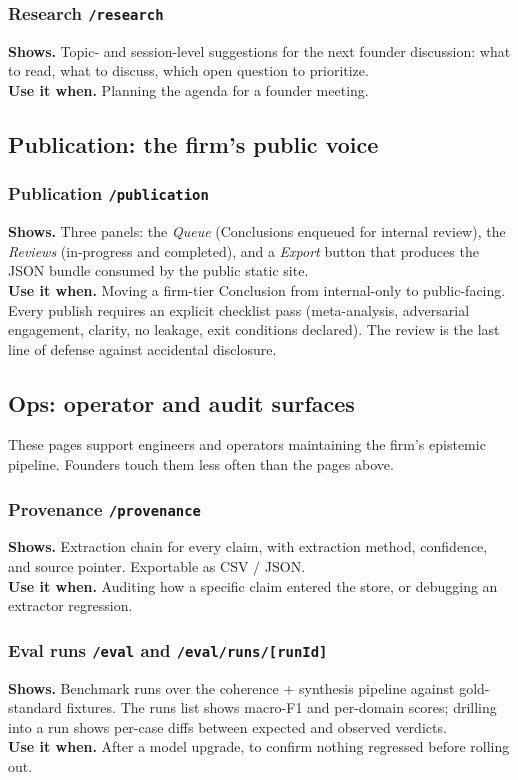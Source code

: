 \documentclass[11pt,letterpaper]{article}
\newcommand{\file}[1]{\texttt{#1}}
\newcommand{\tab}[1]{\textsl{#1}}
\begin{document}
\subsubsection*{Research \hfill \file{/research}}
\textbf{Shows.} Topic- and session-level suggestions for the next founder discussion: what to read, what to discuss, which open question to prioritize. \\
\textbf{Use it when.} Planning the agenda for a founder meeting.

\subsection{Publication: the firm's public voice}

\subsubsection*{Publication \hfill \file{/publication}}
\textbf{Shows.} Three panels: the \tab{Queue} (Conclusions enqueued for internal review), the \tab{Reviews} (in-progress and completed), and a \tab{Export} button that produces the JSON bundle consumed by the public static site. \\
\textbf{Use it when.} Moving a firm-tier Conclusion from internal-only to public-facing. Every publish requires an explicit checklist pass (meta-analysis, adversarial engagement, clarity, no leakage, exit conditions declared). The review is the last line of defense against accidental disclosure.

\subsection{Ops: operator and audit surfaces}

These pages support engineers and operators maintaining the firm's epistemic pipeline. Founders touch them less often than the pages above.

\subsubsection*{Provenance \hfill \file{/provenance}}
\textbf{Shows.} Extraction chain for every claim, with extraction method, confidence, and source pointer. Exportable as CSV / JSON. \\
\textbf{Use it when.} Auditing how a specific claim entered the store, or debugging an extractor regression.

\subsubsection*{Eval runs \hfill \file{/eval} and \file{/eval/runs/[runId]}}
\textbf{Shows.} Benchmark runs over the coherence + synthesis pipeline against gold-standard fixtures. The runs list shows macro-F1 and per-domain scores; drilling into a run shows per-case diffs between expected and observed verdicts. \\
\textbf{Use it when.} After a model upgrade, to confirm nothing regressed before rolling out.
\end{document}
